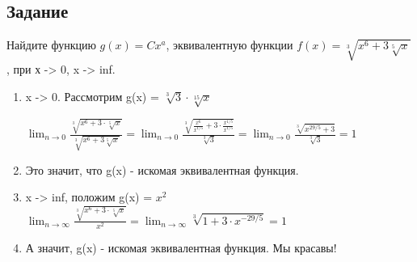     \subsection*{Задание}
    Найдите функцию $g(x) = Cx^a$, эквивалентную функции $f(x)= \sqrt[3]{x^6+3\sqrt[5]{x}}$, при х -> 0, x -> inf.
        \begin{enumerate}
            \item x -> 0. Рассмотрим g(x) = $\sqrt[3]{3}\cdot\sqrt[15]{x}$
            
            $\displaystyle \lim_{n\rightarrow 0} 
               \frac{
                   \sqrt[3]{x^6+3\cdot \sqrt[5]{x}}
               }
               {
               \sqrt[3]{x^6+3\sqrt[5]{x}}
               }
               =
               \displaystyle \lim_{n\rightarrow 0} 
               \frac{
                   \sqrt[3]{\frac{x^6}{x^{1/5}} + 3 \cdot \frac{x^{1/5}}{x^{1/5}}}
               }
               {
               \sqrt[3]{3}
               }
               =
               \displaystyle \lim_{n\rightarrow 0} 
               \frac{
                   \sqrt[3]{x^{29/5} + 3}
               }
               {
               \sqrt[3]{3}
               }
               = 
               1
$    
            \item Это значит, что g(x) - искомая эквивалентная функция.
            
            \item x -> inf, положим g(x) = $x^2$
            $\displaystyle \lim_{n\rightarrow \infty} 
               \frac{
                   \sqrt[3]{x^6+3\cdot \sqrt[5]{x}}
               }
               {
               x^2
               }
               =
               \displaystyle \lim_{n\rightarrow \infty} 
                   \sqrt[3]{1 + 3 \cdot x^{-29/5}}
               = 
               1
$    
    \item А значит, g(x) - искомая эквивалентная функция. Мы красавы!
        \end{enumerate}
